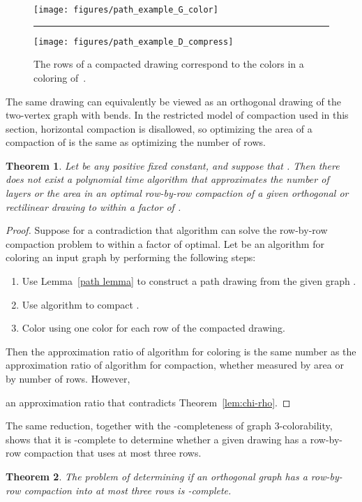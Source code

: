 \documentclass[12pt]{article}
\newtheorem{theorem}{Theorem}
\theoremstyle{definitions}
\begin{document}
\begin{figure}[t]
\centering
\texttt{[image: figures/path\_example\_G\_color]}\rule{4em}{0em}
\texttt{[image: figures/path\_example\_D\_compress]}
\caption{The rows of a compacted drawing  correspond to the colors in a coloring of~.}
\label{fig:row-by-row-coloring}
\end{figure}

The same drawing  can equivalently be viewed as an orthogonal drawing of the two-vertex graph  with  bends. In the restricted model of compaction used in this section, horizontal compaction is disallowed, so optimizing the area of a compaction of  is the same as optimizing the number of rows.

\begin{theorem}
\label{thm:row-by-row}
Let  be any positive fixed constant, and suppose that .
Then there does not exist a polynomial time algorithm that
approximates the number of layers or the area in an optimal row-by-row compaction of a
given orthogonal or rectilinear drawing  to within a factor of . 
\end{theorem}

\begin{proof}
Suppose for a contradiction that algorithm  can solve the row-by-row compaction problem to within a factor  of optimal. Let  be an algorithm for  coloring an input graph  by performing the following steps:
\begin{enumerate}
\item Use Lemma~\ref{path lemma} to construct a path drawing  from the given graph .
\item Use algorithm  to compact .
\item Color  using one color for each row of the compacted drawing.
\end{enumerate}
Then the approximation ratio of algorithm  for coloring is the same number  as the approximation ratio of algorithm  for compaction, whether measured by area or by number of rows. However,

an approximation ratio that contradicts Theorem~\ref{lem:chi-rho}.
\end{proof}

The same reduction, together with the -completeness of graph 3-color\-ability, shows that it is -complete to determine whether a given drawing  has a row-by-row compaction that uses at most three rows.

\begin{theorem}
The problem of determining if an orthogonal graph has a row-by-row compaction into at most three rows is -complete.
\end{theorem}
\end{document}
